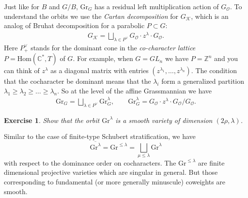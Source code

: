 \documentclass[11pt]{amsart}
\newtheorem{exercise}[dummy]{Exercise}
\theoremstyle{definition}
\newcommand{\bC}{\mathbb{C}}
\newcommand{\Kc}{\mathcal{K}}
\newcommand{\bZ}{\mathbb{Z}}
\newcommand{\Gr}{\mathrm{Gr}}
\newcommand{\Oc}{\mathcal{O}}
\newcommand{\Hom}{\mathrm{Hom}}
\numberwithin{equation}{subsection}
\numberwithin{figure}{subsection}
\begin{document}
Just like for $B$ and $G/B$, $\Gr_G$ has a residual left multiplication action of $G_\Oc$.  To understand the orbits we use the \emph{Cartan decomposition} for $G_\Kc$, which is an analog of Bruhat decomposition for a parabolic $P\subset G$:
\begin{align}
\label{eq:cartan-decomp}
G_\Kc = \bigsqcup_{\lambda \in P^\vee}G_\Oc \cdot z^\lambda \cdot G_\Oc.
\end{align}
Here $P_+^\vee$ stands for the dominant cone in the \emph{co-character lattice} $P=\Hom(\bC^*,T)$ of $G$. For example, when $G=GL_n$ we have $P=\bZ^n$ and you can think of $z^\lambda$ as a diagonal matrix with entries $(z^{\lambda_1},\ldots, z^{\lambda_n})$. The condition that the cocharacter be dominant means that the $\lambda_i$ form a generalized partition $\lambda_1\geq \lambda_2\geq \ldots \geq \lambda_n$. 
So at the level of the affine Grassmannian we have
\begin{align}
\label{eq:gr-decomp}
\Gr_G = \bigsqcup_{\lambda \in P^\vee}\Gr^\lambda_G,\qquad \Gr^\lambda_G=G_\Oc \cdot z^\lambda \cdot G_\Oc/G_\Oc.
\end{align}
\begin{exercise}
Show that the orbit $\Gr^\lambda$ is a smooth variety of dimension $(2\rho,\lambda)$.
\end{exercise}
Similar to the case of finite-type Schubert stratification, we have
$$
\overline{\Gr^\lambda} =\Gr^{\leq\lambda} = \bigsqcup_{\mu\leq\lambda}\Gr^\lambda
$$
with respect to the dominance order on cocharacters. The $\Gr^{\leq\lambda}$ are finite dimensional projective varieties which are singular in general. But those corresponding to fundamental (or more generally minuscule) coweights are smooth.
\end{document}
